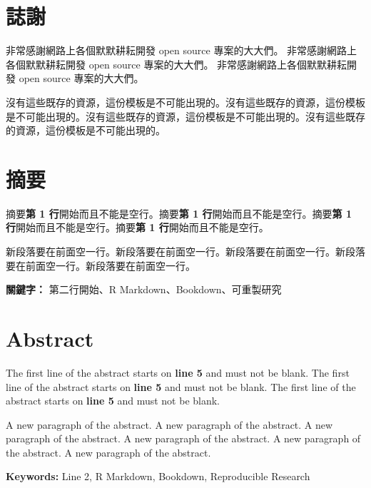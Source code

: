 \documentclass[]{book}
\date{}
\begin{document}


\clearpage
{}

{}



\chapter*{誌謝}
非常感謝網路上各個默默耕耘開發 open source 專案的大大們。
非常感謝網路上各個默默耕耘開發 open source 專案的大大們。
非常感謝網路上各個默默耕耘開發 open source 專案的大大們。

沒有這些既存的資源，這份模板是不可能出現的。沒有這些既存的資源，這份模板是不可能出現的。沒有這些既存的資源，這份模板是不可能出現的。沒有這些既存的資源，這份模板是不可能出現的。


\chapter*{摘要}
摘要\textbf{第 1 行}開始而且不能是空行。摘要\textbf{第 1
行}開始而且不能是空行。摘要\textbf{第 1
行}開始而且不能是空行。摘要\textbf{第 1 行}開始而且不能是空行。

新段落要在前面空一行。新段落要在前面空一行。新段落要在前面空一行。新段落要在前面空一行。新段落要在前面空一行。
\bigbreak

\noindent \textbf{關鍵字：} 第二行開始、R Markdown、Bookdown、可重製研究

\chapter*{Abstract}
The first line of the abstract starts on \textbf{line 5} and must not be
blank. The first line of the abstract starts on \textbf{line 5} and must
not be blank. The first line of the abstract starts on \textbf{line 5}
and must not be blank.

A new paragraph of the abstract. A new paragraph of the abstract. A new
paragraph of the abstract. A new paragraph of the abstract. A new
paragraph of the abstract. A new paragraph of the abstract. \bigbreak

\noindent \textbf{Keywords:} Line 2, R Markdown, Bookdown, Reproducible
Research
\end{document}

